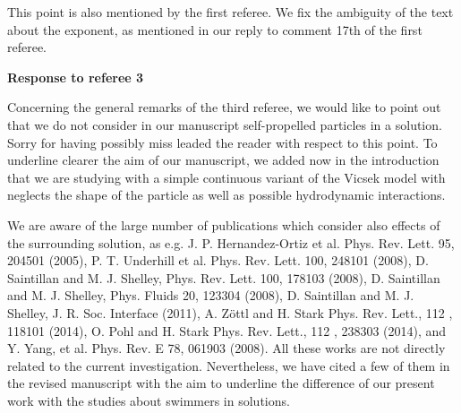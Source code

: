 \documentclass[a4paper,11pt]{letter}
\begin{document}
This point is also mentioned by the first referee. We fix the ambiguity of the text about the exponent, as mentioned in our reply to comment 17th of the first referee.








\pagebreak

{\Large \bf Response to referee 3}

Concerning the general remarks of the third referee, we would like to point out that we do not consider in our manuscript self-propelled particles in a solution. Sorry for having possibly miss leaded the reader with respect to this point. To underline clearer the aim of our manuscript, we added now in the introduction that we are studying with a simple continuous variant of the Vicsek model with neglects the shape of the particle as well as possible hydrodynamic interactions.


We are aware of the large number of publications which consider also effects of the surrounding solution, as e.g. J. P. Hernandez-Ortiz et al. Phys. Rev. Lett. 95, 204501 (2005), P. T. Underhill et al. Phys. Rev. Lett. 100, 248101 (2008), D. Saintillan and M. J. Shelley, Phys. Rev. Lett. 100, 178103 (2008), D. Saintillan and M. J. Shelley, Phys. Fluids 20, 123304 (2008), D. Saintillan and M. J. Shelley, J. R. Soc. Interface (2011), A. Zöttl and H. Stark Phys. Rev. Lett., 112 , 118101 (2014), O. Pohl and H. Stark Phys. Rev. Lett., 112 , 238303 (2014), and Y. Yang, et al. Phys. Rev. E 78, 061903 (2008). All these works are not directly related to the current investigation. Nevertheless, we have cited a few of them in the revised manuscript with the aim to underline the difference of our present work with the studies about swimmers in solutions.
\end{document}
